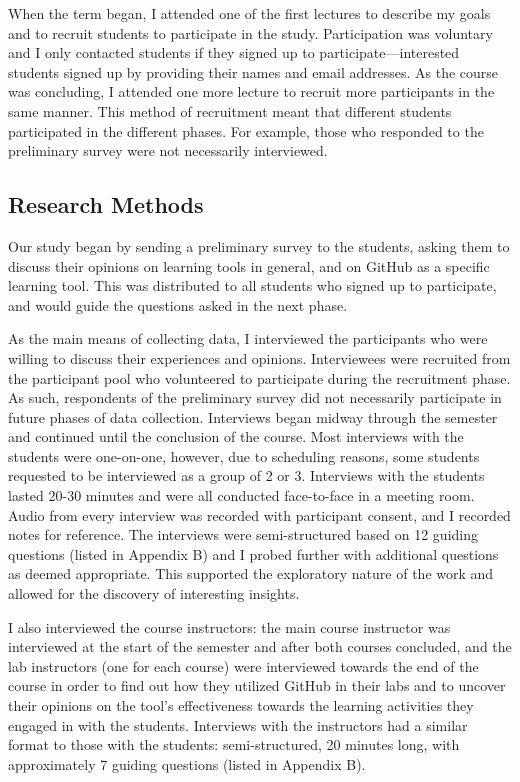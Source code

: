 When the term began, I attended one of the first lectures to describe my goals and to recruit students to participate in the study. Participation was voluntary and I only contacted students if they signed up to participate---interested students signed up by providing their names and email addresses. As the course was concluding, I attended one more lecture to recruit more participants in the same manner. This method of recruitment meant that different students participated in the different phases. For example, those who responded to the preliminary survey were not necessarily interviewed.

\subsection{Research Methods}
Our study began by sending a preliminary survey to the students, asking them to discuss their opinions on learning tools in general, and on GitHub as a specific learning tool. This was distributed to all students who signed up to participate, and would guide the questions asked in the next phase.

As the main means of collecting data, I interviewed the participants who were willing to discuss their experiences and opinions. Interviewees were recruited from the participant pool who volunteered to participate during the recruitment phase. As such, respondents of the preliminary survey did not necessarily participate in future phases of data collection. Interviews began midway through the semester and continued until the conclusion of the course. Most interviews with the students were one-on-one, however, due to scheduling reasons, some students requested to be interviewed as a group of 2 or 3. Interviews with the students lasted 20-30 minutes and were all conducted face-to-face in a meeting room. Audio from every interview was recorded with participant consent, and I recorded notes for reference. The interviews were semi-structured based on 12 guiding questions (listed in Appendix B) and I probed further with additional questions as deemed appropriate. This supported the exploratory nature of the work and allowed for the discovery of interesting insights.

I also interviewed the course instructors: the main course instructor was interviewed at the start of the semester and after both courses concluded, and the lab instructors (one for each course) were interviewed towards the end of the course in order to find out how they utilized GitHub in their labs and to uncover their opinions on the tool's effectiveness towards the learning activities they engaged in with the students. Interviews with the instructors had a similar format to those with the students: semi-structured, 20 minutes long, with approximately 7 guiding questions (listed in Appendix B).

